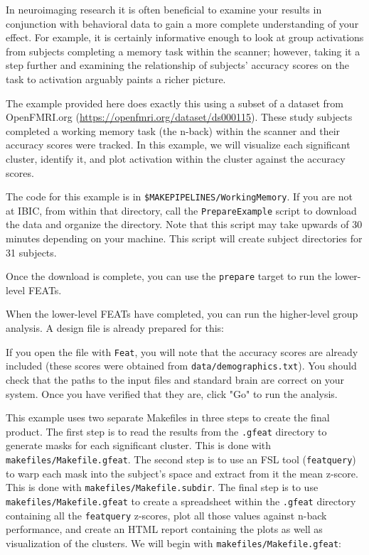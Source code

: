 \label{sec:groupfeatreport}
In neuroimaging research it is often beneficial to examine your results in conjunction with behavioral data to gain a more complete understanding of your effect. For example, it is certainly informative enough to look at group activations from subjects completing a memory task within the scanner; however, taking it a step further and examining the relationship of subjects' accuracy scores on the task to activation arguably paints a richer picture. 

The example provided here does exactly this using a subset of a dataset from OpenFMRI.org (\url{https://openfmri.org/dataset/ds000115}). These study subjects completed a working memory task (the n-back) within the scanner and their accuracy scores were tracked. In this example, we will visualize each significant cluster, identify it, and plot activation within the cluster against the accuracy scores. 

The code for this example is in \texttt{\$MAKEPIPELINES/WorkingMemory}. If you are not at IBIC, from within that directory, call the \texttt{PrepareExample} script to download the data and organize the directory. Note that this script may take upwards of 30 minutes depending on your machine. This script will create subject directories for 31 subjects.

Once the download is complete, you can use the \texttt{prepare} target to run the lower-level FEATs.

When the lower-level FEATs have completed, you can run the higher-level group analysis. A design file is already prepared for this:

If you open the file with \texttt{Feat}, you will note that the accuracy scores are already included (these scores were obtained from \texttt{data/demographics.txt}). You should check that the paths to the input files and standard brain are correct on your system. Once you have verified that they are, click "Go" to run the analysis. 

This example uses two separate Makefiles in three steps to create the final product. The first step is to read the results from the \texttt{.gfeat} directory to generate masks for each significant cluster. This is done with \texttt{makefiles/Makefile.gfeat}. The second step is to use an FSL tool (\texttt{featquery}) to warp each mask into the subject's space and extract from it the mean z-score. This is done with \texttt{makefiles/Makefile.subdir}. The final step is to use \texttt{makefiles/Makefile.gfeat} to create a spreadsheet within the \texttt{.gfeat} directory containing all the \texttt{featquery} z-scores, plot all those values against n-back performance, and create an HTML report containing the plots as well as visualization of the clusters. We will begin with \texttt{makefiles/Makefile.gfeat}:

